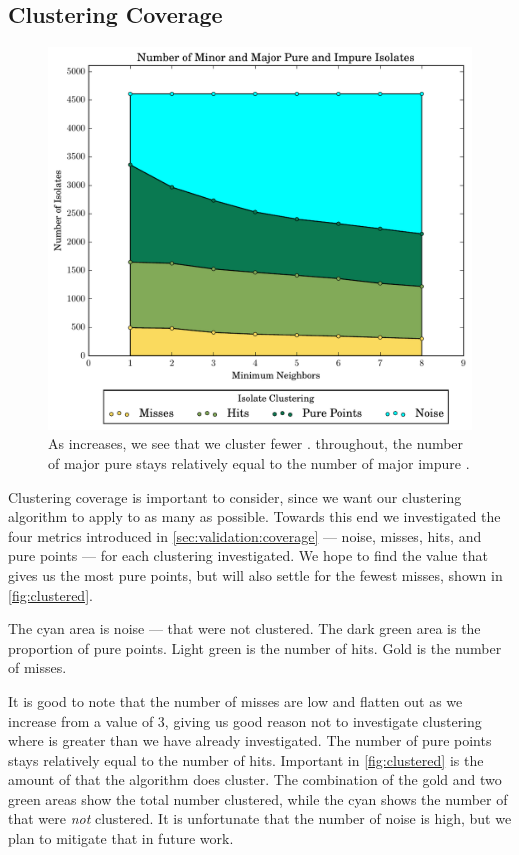 \subsection{Clustering Coverage}
\begin{figure}[ht!]
    \centering
    \includegraphics[width=\linewidth]{figures/bs/neigh_minor_major_impure_filled_stack}
    \caption{As \minneigh{} increases, we see that we cluster fewer \isols{}. throughout, the number of major pure \isols{} stays relatively equal to the number of major impure \isols{}.}
    \label{fig:clustered}
\end{figure}

Clustering coverage is important to consider, since we want our clustering algorithm to apply to as many \isols{} as possible.
Towards this end we investigated the four metrics introduced in \autoref{sec:validation:coverage} --- noise, misses, hits, and pure points --- for each \minneigh{} clustering investigated.
We hope to find the \minneigh{} value that gives us the most pure points, but will also settle for the fewest misses, shown in \autoref{fig:clustered}.

The cyan area is noise --- \isols{} that were not clustered. 
The dark green area is the proportion of pure points. 
Light green is the number of hits.
Gold is the number of misses.

It is good to note that the number of misses are low and flatten out as we increase \minneigh{} from a value of 3, giving us good reason not to investigate clustering where \minneigh{} is greater than we have already investigated.
The number of pure points stays relatively equal to the number of hits.
Important in \autoref{fig:clustered} is the amount of \isols{} that the algorithm does cluster.
The combination of the gold and two green areas show the total number clustered, while the cyan shows the number of \isols{} that were \textit{not} clustered.
It is unfortunate that the number of noise \isols{} is high, but we plan to mitigate that in future work.

